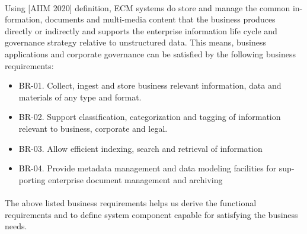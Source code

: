 \documentclass[EPiC]{easychair} %
\begin{document}
\paragraph{}
Using [AIIM 2020] definition, ECM systems do store and manage the common in-formation, documents and multi-media content that the business produces directly or indirectly and supports the enterprise information life cycle and governance strategy relative to unstructured data. This means, business applications and corporate governance can be satisfied by the following business requirements:
\begin{itemize}
    \item BR-01. Collect, ingest and store business relevant information, data and materials of any type and format.
    \item BR-02. Support classification, categorization and tagging of information relevant to business, corporate and legal.
    \item BR-03.  	Allow efficient indexing, search and retrieval of information 
    \item BR-04.  	Provide metadata management and data modeling facilities for sup-porting enterprise document management and archiving 
\end{itemize}

\paragraph{} The above listed business requirements helps us derive the functional requirements and to define system component capable for satisfying the business needs.
\end{document}

